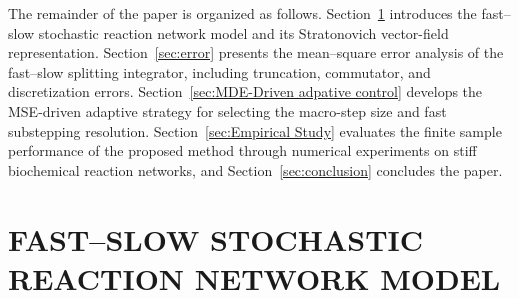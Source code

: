 \documentclass{article}
\begin{document}
The remainder of the paper is organized as follows. 
Section~\ref{sec:problemDescription} introduces the fast--slow stochastic reaction network model and its
Stratonovich vector-field representation. 
Section~\ref{sec:error} presents the mean--square error analysis of the fast--slow splitting
integrator, including truncation, commutator, and discretization errors. 
Section~\ref{sec:MDE-Driven adpative control} develops the MSE-driven adaptive strategy for selecting the macro-step
size and fast substepping resolution. 
Section~\ref{sec:Empirical Study} evaluates the finite sample performance of the proposed method through numerical experiments on stiff biochemical reaction networks, and Section~\ref{sec:conclusion} concludes the paper.


\section{FAST--SLOW STOCHASTIC REACTION NETWORK MODEL}
\label{sec:problemDescription}

\end{document}
